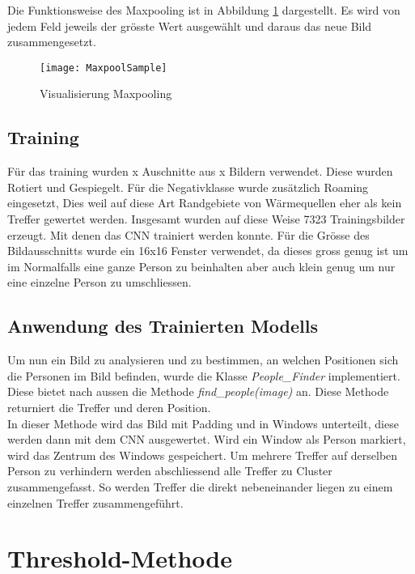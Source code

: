 \noindent Die Funktionsweise des Maxpooling ist in Abbildung \ref{fig:maxpoolSample} dargestellt. Es wird von jedem Feld jeweils der grösste Wert ausgewählt und daraus das neue Bild zusammengesetzt.

\begin{figure}[H]
	\centering
	\texttt{[image: MaxpoolSample]}
	\caption{Visualisierung Maxpooling \parencite{MaxpoolImg2018}}
	\label{fig:maxpoolSample}
\end{figure}

\subsection{Training}

Für das training wurden x Auschnitte aus x Bildern verwendet. Diese wurden Rotiert und Gespiegelt. Für die Negativklasse wurde zusätzlich Roaming eingesetzt, Dies weil auf diese Art Randgebiete von Wärmequellen eher als kein Treffer gewertet werden. Insgesamt wurden auf diese Weise 7323 Trainingsbilder erzeugt. Mit denen das \gls{CNN} trainiert werden konnte. Für die Grösse des Bildausschnitts wurde ein 16x16 Fenster verwendet, da dieses gross genug ist um im Normalfalls eine ganze Person zu beinhalten aber auch klein genug um nur eine einzelne Person zu umschliessen.

\subsection{Anwendung des Trainierten Modells}

Um nun ein Bild zu analysieren und zu bestimmen, an welchen Positionen sich die Personen im Bild befinden, wurde die Klasse \textit{People\_Finder} implementiert. Diese bietet nach aussen die Methode \textit{find\_people(image)} an. Diese Methode returniert die Treffer und deren Position.\\
In dieser Methode wird das Bild mit \gls{Padding} und in \glspl{Window} unterteilt, diese werden dann mit dem \gls{CNN} ausgewertet. Wird ein \gls{Window} als Person markiert, wird das Zentrum des \glspl{Window} gespeichert. Um mehrere Treffer auf derselben Person zu verhindern werden abschliessend alle Treffer zu \gls{Cluster} zusammengefasst. So werden Treffer die direkt nebeneinander liegen zu einem einzelnen Treffer zusammengeführt.

\section{Threshold-Methode}


